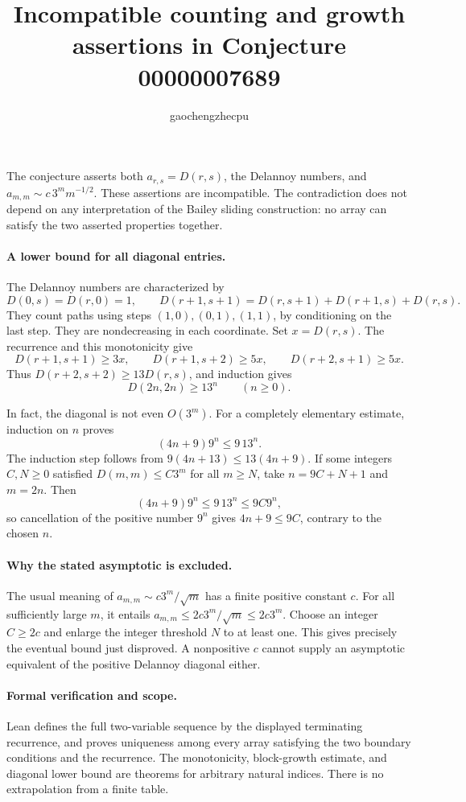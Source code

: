 \documentclass[10pt]{article}
\title{Incompatible counting and growth assertions in Conjecture 00000007689}
\author{gaochengzhecpu}
\date{}
\begin{document}
\maketitle

The conjecture asserts both $a_{r,s}=D(r,s)$, the Delannoy numbers, and
$a_{m,m}\sim c\,3^m m^{-1/2}$. These assertions are incompatible. The
contradiction does not depend on any interpretation of the Bailey sliding
construction: no array can satisfy the two asserted properties together.

\paragraph{A lower bound for all diagonal entries.}
The Delannoy numbers are characterized by
\[
 D(0,s)=D(r,0)=1,\qquad
 D(r+1,s+1)=D(r,s+1)+D(r+1,s)+D(r,s).
\]
They count paths using steps $(1,0),(0,1),(1,1)$, by conditioning on the
last step. They are nondecreasing in each coordinate. Set $x=D(r,s)$.
The recurrence and this monotonicity give
\[
 D(r+1,s+1)\ge3x,\qquad
 D(r+1,s+2)\ge5x,\qquad D(r+2,s+1)\ge5x.
\]
Thus $D(r+2,s+2)\ge13D(r,s)$, and induction gives
\[D(2n,2n)\ge13^n\qquad(n\ge0).\]

In fact, the diagonal is not even $O(3^m)$. For a completely elementary
estimate, induction on $n$ proves
\[(4n+9)9^n\le9\,13^n.\]
The induction step follows from
$9(4n+13)\le13(4n+9)$. If some integers $C,N\ge0$ satisfied
$D(m,m)\le C3^m$ for all $m\ge N$, take $n=9C+N+1$ and $m=2n$.
Then
\[(4n+9)9^n\le9\,13^n\le9C9^n,\]
so cancellation of the positive number $9^n$ gives $4n+9\le9C$,
contrary to the chosen $n$.

\paragraph{Why the stated asymptotic is excluded.}
The usual meaning of $a_{m,m}\sim c3^m/\sqrt m$ has a finite positive
constant $c$. For all sufficiently large $m$, it entails
$a_{m,m}\le2c3^m/\sqrt m\le2c3^m$. Choose an integer $C\ge2c$ and enlarge
the integer threshold $N$ to at least one. This gives precisely the
eventual bound just disproved. A nonpositive $c$ cannot supply an
asymptotic equivalent of the positive Delannoy diagonal either.

\paragraph{Formal verification and scope.}
Lean defines the full two-variable sequence by the displayed terminating
recurrence, and proves uniqueness among every array satisfying the two
boundary conditions and the recurrence. The monotonicity, block-growth
estimate, and diagonal lower bound are theorems for arbitrary natural
indices. There is no extrapolation from a finite table.
\end{document}
